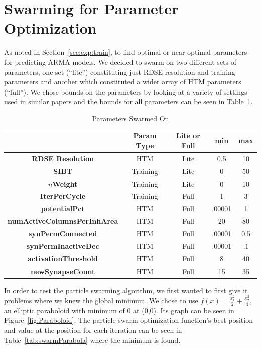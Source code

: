 \documentclass[oneside,12pt,openany]{book}
\begin{document}
    
    
    
    \section{Swarming for Parameter Optimization}\label{sec:res:swarm}
    
    As noted in Section~\ref{sec:exp:train}, to find optimal or near optimal parameters for predicting ARMA models. We decided to swarm on two different sets of parameters, one set (``lite'') constituting just RDSE resolution and training parameters and another which constituted a wider array of HTM parameters (``full'').  We chose bounds on the parameters by looking at a variety of settings used in similar papers and the bounds for all parameters can be seen in Table~\ref{tab:swarming}.
    
    \begin{table}[hbt!]
        \begin{tabular}{|c|c|c|c|c|}
            \hline
            & \textbf{Param Type} & \textbf{Lite or Full} & \textbf{min} & \textbf{max} \\ \hline
            \textbf{RDSE Resolution} & HTM & Lite & 0.5 & 10 \\ \hline
            \textbf{SIBT} & Training & Lite & 0 & 50 \\ \hline
            \textbf{$n$Weight} & Training & Lite & 0 & 10 \\ \hline
            \textbf{IterPerCycle} & Training & Full & 1 & 3 \\ \hline
            \textbf{potentialPct} & HTM & Full & .00001 & 1 \\ \hline
            \textbf{numActiveColumnsPerInhArea} & HTM & Full & 20 & 80 \\ \hline
            \textbf{synPermConnected} & HTM & Full & .00001 & 0.5 \\ \hline
            \textbf{synPermInactiveDec} & HTM & Full & .00001 & .1 \\ \hline
            \textbf{activationThreshold} & HTM & Full & 8 & 40 \\ \hline
            \textbf{newSynapseCount} & HTM & Full & 15 & 35 \\ \hline
        \end{tabular}\caption{Parameters Swarmed On}
        \label{tab:swarming}
    \end{table}
    
    \FloatBarrier
    
    In order to test the particle swarming algorithm, we first wanted to first give it problems where we knew the global minimum. We chose to use $f(x)=\frac{x_{1}^{2}}{2}+\frac{x_{2}^2}{4}$, an elliptic paraboloid with minimum of 0 at (0,0). Its graph can be seen in Figure~\ref{fig:Paraboloid}. The particle swarm optimization function's best position and value at the position for each iteration can be seen in Table~\ref{tab:swarmParabola} where the minimum is found.
    
\end{document}
